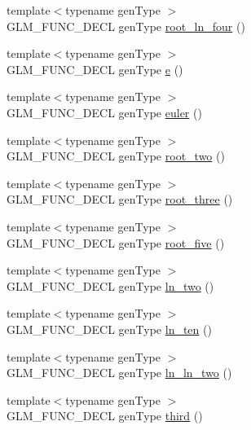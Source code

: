 \begin{DoxyCompactItemize}
{\footnotesize template$<$typename gen\-Type $>$ }\\G\-L\-M\-\_\-\-F\-U\-N\-C\-\_\-\-D\-E\-C\-L gen\-Type \hyperlink{group__gtc__constants_ga9cae3fad9314e34c1d3aab71fcdef05f}{root\-\_\-ln\-\_\-four} ()
\item 
{\footnotesize template$<$typename gen\-Type $>$ }\\G\-L\-M\-\_\-\-F\-U\-N\-C\-\_\-\-D\-E\-C\-L gen\-Type \hyperlink{group__gtc__constants_gab83fb6de0f05d6c0d11bdf0479f8319e}{e} ()
\item 
{\footnotesize template$<$typename gen\-Type $>$ }\\G\-L\-M\-\_\-\-F\-U\-N\-C\-\_\-\-D\-E\-C\-L gen\-Type \hyperlink{group__gtc__constants_ga6f14b46653b7ead1edcbd0fc6c9c5289}{euler} ()
\item 
{\footnotesize template$<$typename gen\-Type $>$ }\\G\-L\-M\-\_\-\-F\-U\-N\-C\-\_\-\-D\-E\-C\-L gen\-Type \hyperlink{group__gtc__constants_gab91b7799f88f9f2be33e385dec11b9c2}{root\-\_\-two} ()
\item 
{\footnotesize template$<$typename gen\-Type $>$ }\\G\-L\-M\-\_\-\-F\-U\-N\-C\-\_\-\-D\-E\-C\-L gen\-Type \hyperlink{group__gtc__constants_gab3183635ac615473e2f95852f491be83}{root\-\_\-three} ()
\item 
{\footnotesize template$<$typename gen\-Type $>$ }\\G\-L\-M\-\_\-\-F\-U\-N\-C\-\_\-\-D\-E\-C\-L gen\-Type \hyperlink{group__gtc__constants_gace2b8dfed1ab9fabbb67dde08e7e5b58}{root\-\_\-five} ()
\item 
{\footnotesize template$<$typename gen\-Type $>$ }\\G\-L\-M\-\_\-\-F\-U\-N\-C\-\_\-\-D\-E\-C\-L gen\-Type \hyperlink{group__gtc__constants_ga22fae798430edc3022766af4fd83e8a4}{ln\-\_\-two} ()
\item 
{\footnotesize template$<$typename gen\-Type $>$ }\\G\-L\-M\-\_\-\-F\-U\-N\-C\-\_\-\-D\-E\-C\-L gen\-Type \hyperlink{group__gtc__constants_ga48addf0cb0980277d208a71a1c59c073}{ln\-\_\-ten} ()
\item 
{\footnotesize template$<$typename gen\-Type $>$ }\\G\-L\-M\-\_\-\-F\-U\-N\-C\-\_\-\-D\-E\-C\-L gen\-Type \hyperlink{group__gtc__constants_ga650774609debe4a90bcac449b574de2c}{ln\-\_\-ln\-\_\-two} ()
\item 
{\footnotesize template$<$typename gen\-Type $>$ }\\G\-L\-M\-\_\-\-F\-U\-N\-C\-\_\-\-D\-E\-C\-L gen\-Type \hyperlink{group__gtc__constants_gabf280496105e0ad070287417f840ebd8}{third} ()

\end{DoxyCompactItemize}
